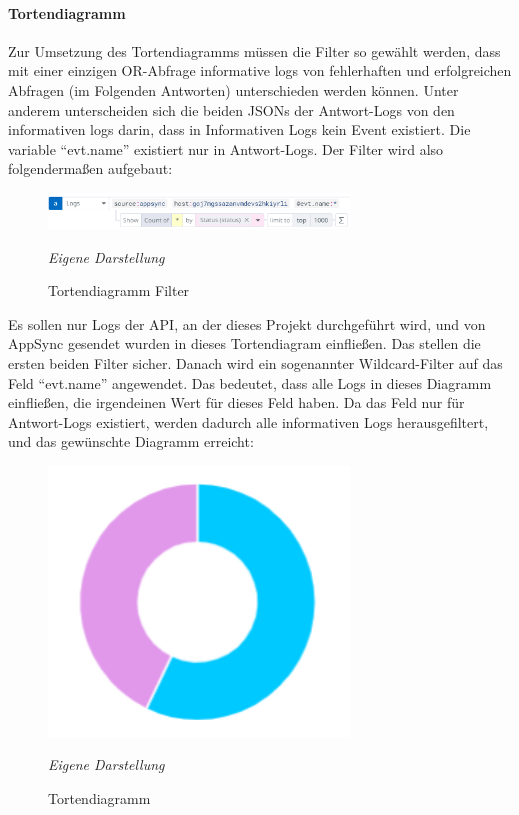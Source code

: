 \paragraph{Tortendiagramm}
Zur Umsetzung des Tortendiagramms müssen die Filter so gewählt werden, dass mit einer einzigen OR-Abfrage informative logs von fehlerhaften und erfolgreichen Abfragen (im Folgenden Antworten) unterschieden werden können. Unter anderem unterscheiden sich die beiden JSONs der Antwort-Logs von den informativen logs darin, dass in Informativen Logs kein Event existiert. Die variable ``evt.name'' existiert nur in Antwort-Logs. Der Filter wird also folgendermaßen aufgebaut: \newline
\begin{figure}[H]
\centering
	\begin{minipage}[t]{.7\textwidth} %
	\caption{Tortendiagramm Filter} %
	
	\includegraphics[width = 8cm,keepaspectratio]{pieChartFilter} \newline
	
	\textit{Eigene Darstellung} %
	\label{fig:pieChartFilter}
	\end{minipage}
	\end{figure}
Es sollen nur Logs der API, an der dieses Projekt durchgeführt wird, und von AppSync gesendet wurden in dieses Tortendiagram einfließen. Das stellen die ersten beiden Filter sicher. Danach wird ein sogenannter Wildcard-Filter auf das Feld ``evt.name'' angewendet. Das bedeutet, dass alle Logs in dieses Diagramm einfließen, die irgendeinen Wert für dieses Feld haben. Da das Feld nur für Antwort-Logs existiert, werden dadurch alle informativen Logs herausgefiltert, und das gewünschte Diagramm erreicht:\newline

	\begin{figure}[H]
	\centering
	\begin{minipage}[t]{.7\textwidth} %
	\caption{Tortendiagramm} %
	
	\includegraphics[width = 8cm,keepaspectratio]{pieChart} \newline
	
	\textit{Eigene Darstellung} %
	\label{fig:pieChart}
	\end{minipage}
	\end{figure}
